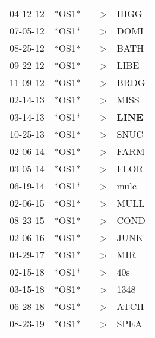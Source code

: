 \begin{supertabular}{p{0.07\textwidth}p{0.06\textwidth}p{0.02\textwidth}p{0.02\textwidth}p{0.06\textwidth}}
          04-12-12\textsuperscript{} &  *OS1* &   &  \textgreater &           HIGG\textsuperscript{} \\
          07-05-12\textsuperscript{} &  *OS1* &   &  \textgreater &           DOMI\textsuperscript{} \\
          08-25-12\textsuperscript{} &  *OS1* &   &  \textgreater &           BATH\textsuperscript{} \\
          09-22-12\textsuperscript{} &  *OS1* &   &  \textgreater &           LIBE\textsuperscript{} \\
          11-09-12\textsuperscript{} &  *OS1* &   &  \textgreater &           BRDG\textsuperscript{} \\
          02-14-13\textsuperscript{} &  *OS1* &   &  \textgreater &           MISS\textsuperscript{} \\
          03-14-13\textsuperscript{} &  *OS1* &   &  \textgreater &  \textbf{LINE\textsuperscript{}} \\
          10-25-13\textsuperscript{} &  *OS1* &   &  \textgreater &           SNUC\textsuperscript{} \\
          02-06-14\textsuperscript{} &  *OS1* &   &  \textgreater &           FARM\textsuperscript{} \\
          03-05-14\textsuperscript{} &  *OS1* &   &  \textgreater &           FLOR\textsuperscript{} \\
          06-19-14\textsuperscript{} &  *OS1* &   &  \textgreater &           mulc\textsuperscript{} \\
          02-06-15\textsuperscript{} &  *OS1* &   &  \textgreater &           MULL\textsuperscript{} \\
          08-23-15\textsuperscript{} &  *OS1* &   &  \textgreater &           COND\textsuperscript{} \\
          02-06-16\textsuperscript{} &  *OS1* &   &  \textgreater &           JUNK\textsuperscript{} \\
          04-29-17\textsuperscript{} &  *OS1* &   &  \textgreater &            MIR\textsuperscript{} \\
          02-15-18\textsuperscript{} &  *OS1* &   &  \textgreater &            40s\textsuperscript{} \\
          03-15-18\textsuperscript{} &  *OS1* &   &  \textgreater &           1348\textsuperscript{} \\
          06-28-18\textsuperscript{} &  *OS1* &   &  \textgreater &           ATCH\textsuperscript{} \\
          08-23-19\textsuperscript{} &  *OS1* &   &  \textgreater &           SPEA\textsuperscript{} \\
\end{supertabular}
